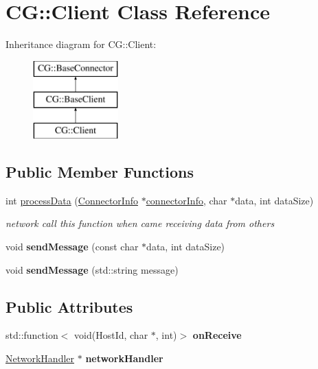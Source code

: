 \hypertarget{class_c_g_1_1_client}{}\section{CG\+:\+:Client Class Reference}
\label{class_c_g_1_1_client}
Inheritance diagram for CG\+:\+:Client\+:\begin{figure}[H]
\begin{center}
\leavevmode
\includegraphics[height=3.000000cm]{class_c_g_1_1_client}
\end{center}
\end{figure}
\subsection*{Public Member Functions}
\begin{DoxyCompactItemize}
\item 
int \mbox{\hyperlink{class_c_g_1_1_client_ad56b8a63eea5c2fea2a0b254758468dd}{process\+Data}} (\mbox{\hyperlink{class_c_g_1_1_connector_info}{Connector\+Info}} $\ast$\mbox{\hyperlink{class_c_g_1_1_base_connector_ae68321ba56404549f2e655238035ed8d}{connector\+Info}}, char $\ast$data, int data\+Size)
\begin{DoxyCompactList}\small\item\em network call this function when came receiving data from others \end{DoxyCompactList}\item 
\mbox{\label{class_c_g_1_1_client_a29e0c78ca332fcdbc47db9cd72616fae}} 
void {\bfseries send\+Message} (const char $\ast$data, int data\+Size)
\item 
\mbox{\label{class_c_g_1_1_client_a5e84eb047a1a425b1a1abd3291c8a0d1}} 
void {\bfseries send\+Message} (std\+::string message)
\end{DoxyCompactItemize}
\subsection*{Public Attributes}
\begin{DoxyCompactItemize}
\item 
\mbox{\label{class_c_g_1_1_client_a2c4e42613c4f738c8930b37cf31e864f}} 
std\+::function$<$ void(Host\+Id, char $\ast$, int)$>$ {\bfseries on\+Receive}
\item 
\mbox{\label{class_c_g_1_1_client_a38410c9c6bb7ce839a3286b785e04cf9}} 
\mbox{\hyperlink{class_c_g_1_1_network_handler}{Network\+Handler}} $\ast$ {\bfseries network\+Handler}
\end{DoxyCompactItemize}

